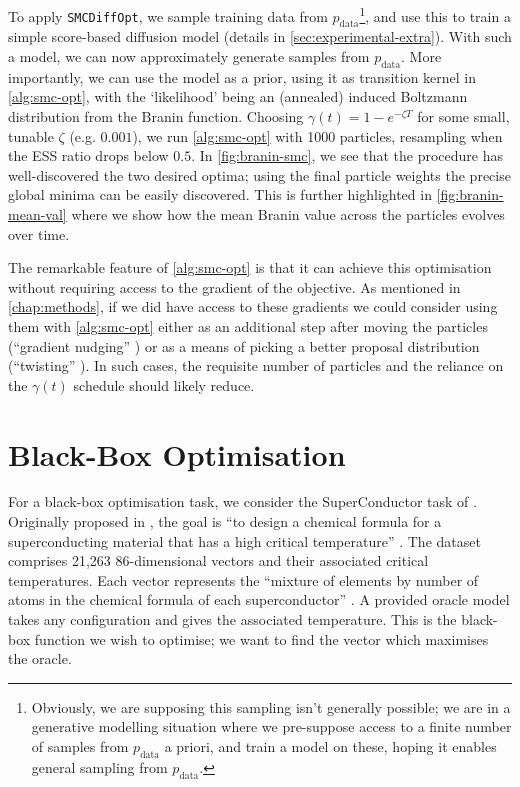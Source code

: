 To apply \texttt{SMCDiffOpt}, we sample training data from $p_{\text{data}}$\footnote{Obviously, we
are supposing this sampling isn't generally possible; we are in a generative modelling situation
where we pre-suppose access to a finite number of samples from $p_{\text{data}}$ a priori, and
train a model on these, hoping it enables general sampling from $p_{\text{data}}$.}, and use this
to train a simple score-based diffusion model (details in \autoref{sec:experimental-extra}). With such
a model, we can now approximately generate samples from $p_{\text{data}}$. More importantly, we can
use the model as a prior, using it as transition kernel in \autoref{alg:smc-opt}, with the `likelihood'
being an (annealed) induced Boltzmann distribution from the Branin function. Choosing
$\gamma(t) = 1 - e^{-\zeta T}$ for some small, tunable $\zeta$ (e.g. $0.001$), we run
\autoref{alg:smc-opt} with 1000 particles, resampling when the ESS ratio drops below $0.5$. In
\autoref{fig:branin-smc}, we see that the procedure has well-discovered the two desired optima;
using the final particle weights the precise global minima can be easily discovered. This is further
highlighted in \autoref{fig:branin-mean-val} where we show how the mean Branin value across the
particles evolves over time.

The remarkable feature of \autoref{alg:smc-opt} is that it can achieve this optimisation without
requiring access to the gradient of the objective. As mentioned in \autoref{chap:methods}, if we did
have access to these gradients we could consider using them with \autoref{alg:smc-opt} either as an
additional step after moving the particles
(``gradient nudging'' \parencite{akyildizNudgingParticleFilter2020}) or as a means of picking a
better proposal distribution (``twisting'' \parencite{wuPracticalAsymptoticallyExact2023}). In
such cases, the requisite number of particles and the reliance on the $\gamma(t)$ schedule should
likely reduce.

\section{Black-Box Optimisation} \label{sec:superconductor}

For a black-box optimisation task, we consider the SuperConductor task of
\textcite{trabuccoDesignBenchBenchmarksDataDriven2022}. Originally proposed in
\textcite{HAMIDIEH2018346}, the goal is ``to design a chemical formula for a superconducting
material that has a high critical temperature'' \parencite{trabuccoDesignBenchBenchmarksDataDriven2022}.
The dataset comprises 21,263 86-dimensional vectors and their associated critical temperatures. Each
vector represents the ``mixture of elements by number of atoms in the chemical
formula of each superconductor'' \parencite{trabuccoDesignBenchBenchmarksDataDriven2022}. A provided
oracle model takes any configuration and gives the associated temperature. This is the black-box
function we wish to optimise; we want to find the vector which maximises the oracle.

